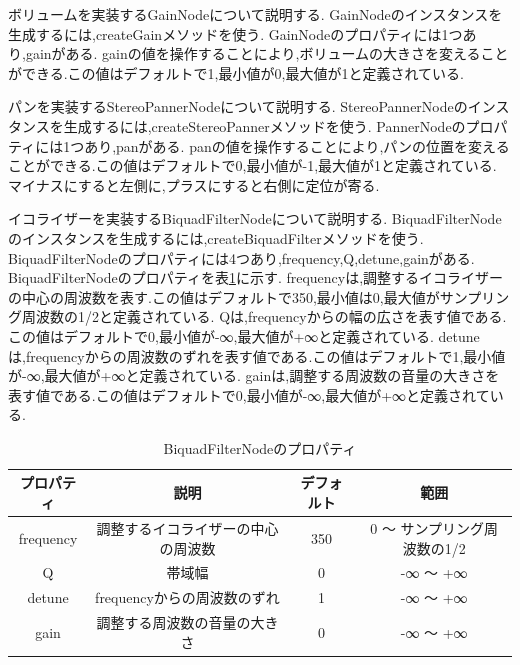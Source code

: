 \documentclass[12pt,a4j,titlepage]{ltjsarticle}
\begin{document}
ボリュームを実装するGainNodeについて説明する.
GainNodeのインスタンスを生成するには,createGainメソッドを使う.
GainNodeのプロパティには1つあり,gainがある.
gainの値を操作することにより,ボリュームの大きさを変えることができる.この値はデフォルトで1,最小値が0,最大値が1と定義されている.

パンを実装するStereoPannerNodeについて説明する.
StereoPannerNodeのインスタンスを生成するには,createStereoPannerメソッドを使う.
PannerNodeのプロパティには1つあり,panがある.
panの値を操作することにより,パンの位置を変えることができる.この値はデフォルトで0,最小値が-1,最大値が1と定義されている.
マイナスにすると左側に,プラスにすると右側に定位が寄る.

イコライザーを実装するBiquadFilterNodeについて説明する.
BiquadFilterNodeのインスタンスを生成するには,createBiquadFilterメソッドを使う.
BiquadFilterNodeのプロパティには4つあり,frequency,Q,detune,gainがある.
BiquadFilterNodeのプロパティを表\ref{table:biquadfilternode}に示す.
frequencyは,調整するイコライザーの中心の周波数を表す.この値はデフォルトで350,最小値は0,最大値がサンプリング周波数の1/2と定義されている.
Qは,frequencyからの幅の広さを表す値である.この値はデフォルトで0,最小値が-∞,最大値が+∞と定義されている.
detuneは,frequencyからの周波数のずれを表す値である.この値はデフォルトで1,最小値が-∞,最大値が+∞と定義されている.
gainは,調整する周波数の音量の大きさを表す値である.この値はデフォルトで0,最小値が-∞,最大値が+∞と定義されている.

\begin{table}[h]
  \centering
  \caption{BiquadFilterNodeのプロパティ}
  \label{table:biquadfilternode}
  \small
  \begin{tabular}{cccc}
    \hline
    プロパティ  & 説明 & デフォルト & 範囲    \\
    \hline \hline
    frequency  & 調整するイコライザーの中心の周波数 & 350 & 0 ～ サンプリング周波数の1/2\\
    \hline
    Q  & 帯域幅 & 0 & -∞ ～ +∞\\
    \hline
    detune  &  frequencyからの周波数のずれ & 1 & -∞ ～ +∞\\
    \hline
    gain  &  調整する周波数の音量の大きさ & 0 & -∞ ～ +∞\\
    \hline
  \end{tabular}
\end{table}
\end{document}
